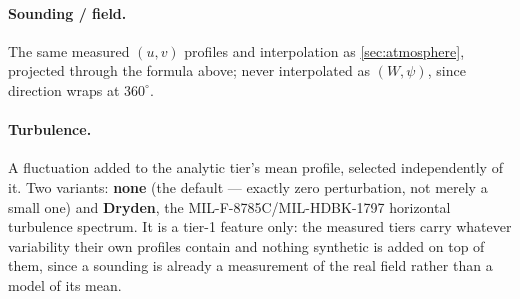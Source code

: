 \paragraph{Sounding / field.} The same measured $(u,v)$ profiles and interpolation as
\autoref{sec:atmosphere}, projected through the formula above; never interpolated as $(W,\psi)$,
since direction wraps at $360^\circ$.

\paragraph{Turbulence.} A fluctuation added to the analytic tier's mean profile, selected
independently of it. Two variants: \textbf{none} (the default --- exactly zero perturbation, not
merely a small one) and \textbf{Dryden}, the MIL-F-8785C/MIL-HDBK-1797 horizontal turbulence
spectrum. It is a tier-1 feature only: the measured tiers carry whatever variability their own
profiles contain and nothing synthetic is added on top of them, since a sounding is already a
measurement of the real field rather than a model of its mean.

